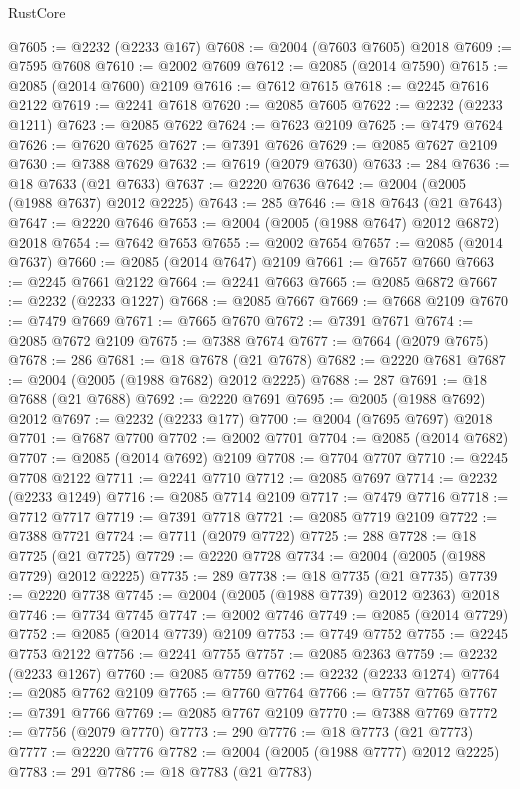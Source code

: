 \begin{lexlean}{RustCore}
\begin{coremodule}
@7605 := @2232 (@2233 @167)
@7608 := @2004 (@7603 @7605) @2018
@7609 := @7595 @7608
@7610 := @2002 @7609
@7612 := @2085 (@2014 @7590)
@7615 := @2085 (@2014 @7600) @2109
@7616 := @7612 @7615
@7618 := @2245 @7616 @2122
@7619 := @2241 @7618
@7620 := @2085 @7605
@7622 := @2232 (@2233 @1211)
@7623 := @2085 @7622
@7624 := @7623 @2109
@7625 := @7479 @7624
@7626 := @7620 @7625
@7627 := @7391 @7626
@7629 := @2085 @7627 @2109
@7630 := @7388 @7629
@7632 := @7619 (@2079 @7630)
@7633 := 284
@7636 := @18 @7633 (@21 @7633)
@7637 := @2220 @7636
@7642 := @2004 (@2005 (@1988 @7637) @2012 @2225)
@7643 := 285
@7646 := @18 @7643 (@21 @7643)
@7647 := @2220 @7646
@7653 := @2004 (@2005 (@1988 @7647) @2012 @6872) @2018
@7654 := @7642 @7653
@7655 := @2002 @7654
@7657 := @2085 (@2014 @7637)
@7660 := @2085 (@2014 @7647) @2109
@7661 := @7657 @7660
@7663 := @2245 @7661 @2122
@7664 := @2241 @7663
@7665 := @2085 @6872
@7667 := @2232 (@2233 @1227)
@7668 := @2085 @7667
@7669 := @7668 @2109
@7670 := @7479 @7669
@7671 := @7665 @7670
@7672 := @7391 @7671
@7674 := @2085 @7672 @2109
@7675 := @7388 @7674
@7677 := @7664 (@2079 @7675)
@7678 := 286
@7681 := @18 @7678 (@21 @7678)
@7682 := @2220 @7681
@7687 := @2004 (@2005 (@1988 @7682) @2012 @2225)
@7688 := 287
@7691 := @18 @7688 (@21 @7688)
@7692 := @2220 @7691
@7695 := @2005 (@1988 @7692) @2012
@7697 := @2232 (@2233 @177)
@7700 := @2004 (@7695 @7697) @2018
@7701 := @7687 @7700
@7702 := @2002 @7701
@7704 := @2085 (@2014 @7682)
@7707 := @2085 (@2014 @7692) @2109
@7708 := @7704 @7707
@7710 := @2245 @7708 @2122
@7711 := @2241 @7710
@7712 := @2085 @7697
@7714 := @2232 (@2233 @1249)
@7716 := @2085 @7714 @2109
@7717 := @7479 @7716
@7718 := @7712 @7717
@7719 := @7391 @7718
@7721 := @2085 @7719 @2109
@7722 := @7388 @7721
@7724 := @7711 (@2079 @7722)
@7725 := 288
@7728 := @18 @7725 (@21 @7725)
@7729 := @2220 @7728
@7734 := @2004 (@2005 (@1988 @7729) @2012 @2225)
@7735 := 289
@7738 := @18 @7735 (@21 @7735)
@7739 := @2220 @7738
@7745 := @2004 (@2005 (@1988 @7739) @2012 @2363) @2018
@7746 := @7734 @7745
@7747 := @2002 @7746
@7749 := @2085 (@2014 @7729)
@7752 := @2085 (@2014 @7739) @2109
@7753 := @7749 @7752
@7755 := @2245 @7753 @2122
@7756 := @2241 @7755
@7757 := @2085 @2363
@7759 := @2232 (@2233 @1267)
@7760 := @2085 @7759
@7762 := @2232 (@2233 @1274)
@7764 := @2085 @7762 @2109
@7765 := @7760 @7764
@7766 := @7757 @7765
@7767 := @7391 @7766
@7769 := @2085 @7767 @2109
@7770 := @7388 @7769
@7772 := @7756 (@2079 @7770)
@7773 := 290
@7776 := @18 @7773 (@21 @7773)
@7777 := @2220 @7776
@7782 := @2004 (@2005 (@1988 @7777) @2012 @2225)
@7783 := 291
@7786 := @18 @7783 (@21 @7783)

\end{coremodule}
\end{lexlean}
